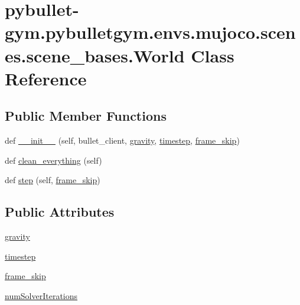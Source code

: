 \hypertarget{classpybullet-gym_1_1pybulletgym_1_1envs_1_1mujoco_1_1scenes_1_1scene__bases_1_1_world}{}\section{pybullet-\/gym.pybulletgym.\+envs.\+mujoco.\+scenes.\+scene\+\_\+bases.\+World Class Reference}
\label{classpybullet-gym_1_1pybulletgym_1_1envs_1_1mujoco_1_1scenes_1_1scene__bases_1_1_world}
\subsection*{Public Member Functions}
\begin{DoxyCompactItemize}
\item 
def \hyperlink{classpybullet-gym_1_1pybulletgym_1_1envs_1_1mujoco_1_1scenes_1_1scene__bases_1_1_world_ad7c67cfab1a4003f3ed1dea24189b30c}{\+\_\+\+\_\+init\+\_\+\+\_\+} (self, bullet\+\_\+client, \hyperlink{classpybullet-gym_1_1pybulletgym_1_1envs_1_1mujoco_1_1scenes_1_1scene__bases_1_1_world_a531973cb55db95c2b11c819056785063}{gravity}, \hyperlink{classpybullet-gym_1_1pybulletgym_1_1envs_1_1mujoco_1_1scenes_1_1scene__bases_1_1_world_a0fb9463209c135067d062c1fecff8be7}{timestep}, \hyperlink{classpybullet-gym_1_1pybulletgym_1_1envs_1_1mujoco_1_1scenes_1_1scene__bases_1_1_world_a4d0a5a13e76cbec96309c48b1328c93d}{frame\+\_\+skip})
\item 
def \hyperlink{classpybullet-gym_1_1pybulletgym_1_1envs_1_1mujoco_1_1scenes_1_1scene__bases_1_1_world_a2f5cf700cb3985636a9cd6300eb9cddc}{clean\+\_\+everything} (self)
\item 
def \hyperlink{classpybullet-gym_1_1pybulletgym_1_1envs_1_1mujoco_1_1scenes_1_1scene__bases_1_1_world_a52c65f1ce47d3f11fb63cc15e77712a2}{step} (self, \hyperlink{classpybullet-gym_1_1pybulletgym_1_1envs_1_1mujoco_1_1scenes_1_1scene__bases_1_1_world_a4d0a5a13e76cbec96309c48b1328c93d}{frame\+\_\+skip})
\end{DoxyCompactItemize}
\subsection*{Public Attributes}
\begin{DoxyCompactItemize}
\item 
\hyperlink{classpybullet-gym_1_1pybulletgym_1_1envs_1_1mujoco_1_1scenes_1_1scene__bases_1_1_world_a531973cb55db95c2b11c819056785063}{gravity}
\item 
\hyperlink{classpybullet-gym_1_1pybulletgym_1_1envs_1_1mujoco_1_1scenes_1_1scene__bases_1_1_world_a0fb9463209c135067d062c1fecff8be7}{timestep}
\item 
\hyperlink{classpybullet-gym_1_1pybulletgym_1_1envs_1_1mujoco_1_1scenes_1_1scene__bases_1_1_world_a4d0a5a13e76cbec96309c48b1328c93d}{frame\+\_\+skip}
\item 
\hyperlink{classpybullet-gym_1_1pybulletgym_1_1envs_1_1mujoco_1_1scenes_1_1scene__bases_1_1_world_ab7848d30ccd5952b7283d9f738191540}{num\+Solver\+Iterations}
\end{DoxyCompactItemize}


